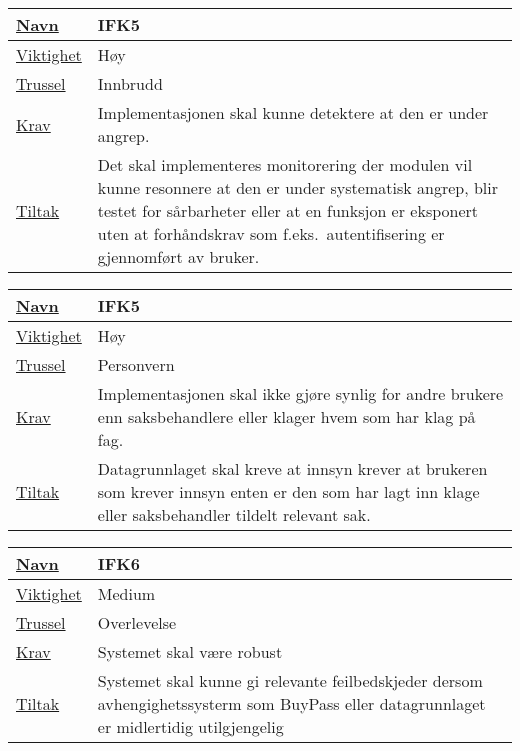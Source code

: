 \begin{tabularx}{\textwidth}{|l|X|}
  \hline
  \underline{Navn} & IFK5 \\ \hline
  \underline{Viktighet} & Høy \\ \hline
  \underline{Trussel} & Innbrudd \\ \hline
  \underline{Krav} & Implementasjonen skal kunne detektere at den er under angrep. \\ \hline
  \underline{Tiltak} & Det skal implementeres monitorering der modulen vil kunne resonnere at den er under systematisk angrep, blir testet for sårbarheter eller at en funksjon er
  eksponert uten at forhåndskrav som f.eks.\ autentifisering er gjennomført av bruker. \\ \hline
\end{tabularx}

\begin{tabularx}{\textwidth}{|l|X|}
  \hline
  \underline{Navn} & IFK5 \\ \hline
  \underline{Viktighet} & Høy \\ \hline
  \underline{Trussel} & Personvern \\ \hline
  \underline{Krav} & Implementasjonen skal ikke gjøre synlig for andre brukere enn saksbehandlere eller klager hvem som har klag på fag. \\ \hline
  \underline{Tiltak} & Datagrunnlaget skal kreve at innsyn krever at brukeren som krever innsyn enten er den som har lagt inn klage eller saksbehandler tildelt relevant sak. \\ \hline
\end{tabularx}

\begin{tabularx}{\textwidth}{|l|X|}
  \hline
  \underline{Navn} & IFK6 \\ \hline
  \underline{Viktighet} & Medium \\ \hline
  \underline{Trussel} & Overlevelse \\ \hline
  \underline{Krav} & Systemet skal være robust \\ \hline
  \underline{Tiltak} & Systemet skal kunne gi relevante feilbedskjeder dersom avhengighetssysterm som BuyPass eller datagrunnlaget er midlertidig utilgjengelig \\ \hline 
\end{tabularx}

